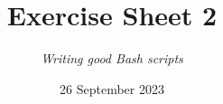 




\title{{\vspace{-15mm}\huge\textbf{Exercise Sheet 2}}}
\author{\textit{Writing good Bash scripts}}
\date{{\small 26 September 2023}}


    \maketitle
    
    \medskip
    
    \medskip
    
    \newpage
    
    \newpage
    
    \medskip
    
